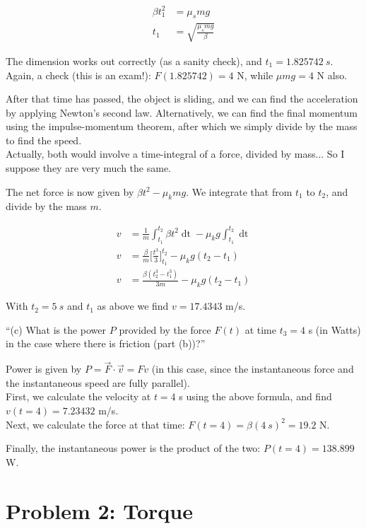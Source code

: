\documentclass[8.01x]{subfiles}
\begin{document}
\begin{align}
\beta t_1^2 &= \mu_s m g\\
t_1 &= \sqrt{\frac{\mu_s m g}{\beta}}
\end{align}

The dimension works out correctly (as a sanity check), and $t_1 = \SI{1.825742}{s}$.\\
Again, a check (this is an exam!): $F(1.825742) = 4$ N, while $\mu m g = 4$ N also.

After that time has passed, the object is sliding, and we can find the acceleration by applying Newton's second law. Alternatively, we can find the final momentum using the impulse-momentum theorem, after which we simply divide by the mass to find the speed.\\
Actually, both would involve a time-integral of a force, divided by mass... So I suppose they are very much the same.

The net force is now given by $\beta t^2 - \mu_k m g$. We integrate that from $t_1$ to $t_2$, and divide by the mass $m$.

\begin{align}
v &= \frac{1}{m} \int_{t_1}^{t_2} \beta t^2 \mathop{dt} - \mu_k g \int_{t_1}^{t_2} \mathop{dt}\\
v &= \frac{\beta}{m} \Big[ \frac{t^3}{3} \Big]_{t_1}^{t_2} - \mu_k g (t_2 - t_1)\\
v &= \frac{\beta (t_2^3 - t_1^3)}{3m} - \mu_k g (t_2 - t_1)
\end{align}

With $t_2 = \SI{5}{s}$ and $t_1$ as above we find $v = 17.4343$ m/s.

``(c) What is the power $P$ provided by the force $F(t)$ at time $t_3 = 4$ s (in Watts) in the case where there is friction (part (b))?''

Power is given by $P = \vec{F} \cdot \vec{v} = F v$ (in this case, since the instantaneous force and the instantaneous speed are fully parallel).\\
First, we calculate the velocity at $t = 4$ s using the above formula, and find $v(t=4) = 7.23432$ m/s.\\
Next, we calculate the force at that time: $F(t=4) = \beta (\SI{4}{s})^2 = 19.2 $ N.

Finally, the instantaneous power is the product of the two: $P(t=4) = 138.899$ W.

\section{Problem 2: Torque}
\end{document}
